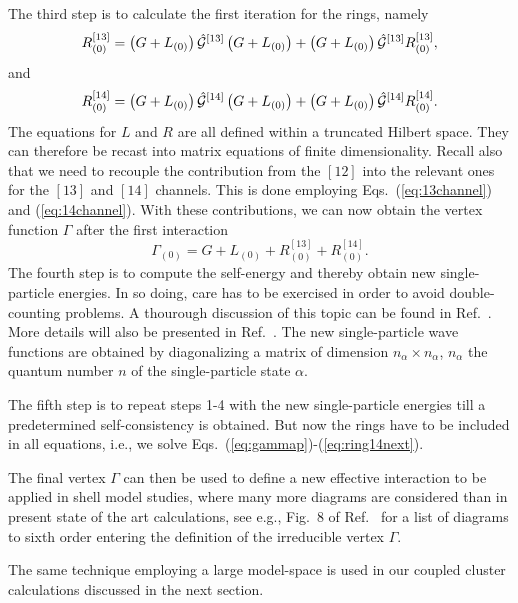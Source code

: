 \documentclass{article}
\begin{document}
The third step is to calculate the first iteration for the  
rings, namely
\begin{equation}
    R_{(0)}^{[13]}=\left(G+L_{(0)}\right)\hat{{\cal G}}^{[13]}
             \left(G+L_{(0)}\right) + 
             \left(G+L_{(0)}\right)\hat{{\cal G}}^{[13]}R_{(0)}^{[13]},
    \label{eq:ring13first}
\end{equation}
and
\begin{equation}
    R_{(0)}^{[14]}=\left(G+L_{(0)}\right)\hat{{\cal G}}^{[14]}
             \left(G+L_{(0)}\right) + 
             \left(G+L_{(0)}\right)\hat{{\cal G}}^{[14]}R_{(0)}^{[14]}.
    \label{eq:ring14first}
\end{equation}
The equations for $L$ and $R$ are all defined within a
truncated Hilbert space. They can therefore be recast into
matrix equations of finite dimensionality.
Recall also  that we need to recouple the contribution
from the $[12]$ into the relevant ones for the $[13]$ and $[14]$
channels. This is done employing Eqs.\ (\ref{eq:13channel}) and
(\ref{eq:14channel}). 
With these contributions, we can now obtain the vertex function
$\Gamma$ after the first interaction
\begin{equation}
    \Gamma_{(0)}=G+L_{(0)}+R_{(0)}^{[13]}+R_{(0)}^{[14]}.
\end{equation}
The fourth step is to compute the self-energy and thereby obtain
new single-particle energies. In so doing, care has to be exercised
in order to avoid double-counting problems. A thourough discussion
of this topic can be found in Ref.\ \cite{jls82}. More details
will also be presented in Ref.\ \cite{mhj99}.
The new single-particle wave functions are obtained
by diagonalizing a matrix of dimension 
$n_{\alpha}\times n_{\alpha}$, $n_{\alpha}$ the quantum
number $n$ of the single-particle state $\alpha$. 

The fifth step is to repeat steps 1-4 with the new single-particle
energies till a predetermined self-consistency is obtained. 
But now the rings have to be included in all equations, i.e.,
we solve Eqs.\ (\ref{eq:gammap})-(\ref{eq:ring14next}). 

The final vertex $\Gamma$ can then be used to define a 
new effective interaction to be applied in shell model studies,
where many more diagrams are considered than in present 
state of the art calculations, see e.g., Fig.\ 8 of Ref.\ \cite{jls82}
for a list of diagrams to sixth order entering the definition
of  the irreducible vertex $\Gamma$. 

The same technique employing a large model-space is used in our 
coupled cluster calculations discussed in the next section.
\end{document}
